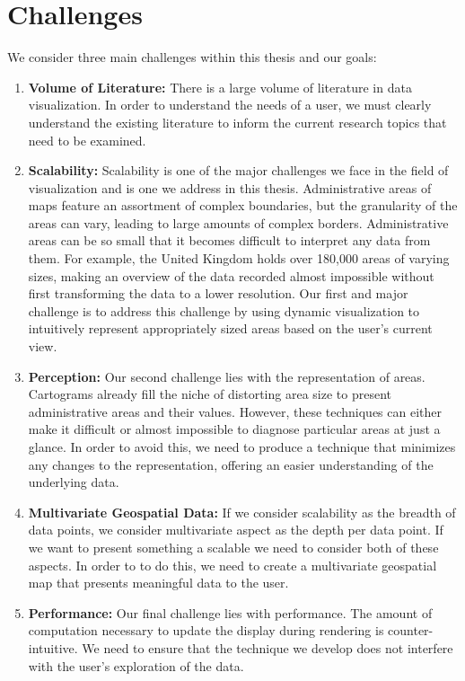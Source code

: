 \section{Challenges} \label{sec:challenges}
We consider three main challenges within this thesis and our goals:
\begin{enumerate}
\item \textbf{Volume of Literature:} There is a large volume of literature in data visualization. In order to understand the needs of a user, we must clearly understand the existing literature to inform the current research topics that need to be examined. 
\item \textbf{Scalability:} Scalability is one of the major challenges we face in the field of visualization and is one we address in this thesis. Administrative areas of maps feature an assortment of complex boundaries, but the granularity of the areas can vary, leading to large amounts of complex borders. Administrative areas can be so small that it becomes difficult to interpret any data from them. For example, the United Kingdom holds over 180,000 areas of varying sizes, making an overview of the data recorded almost impossible without first transforming the data to a lower resolution. Our first and major challenge is to address this challenge by using dynamic visualization to intuitively represent appropriately sized areas based on the user's current view.
\item \textbf{Perception:} Our second challenge lies with the representation of areas. Cartograms already fill the niche of distorting area size to present administrative areas and their values. However, these techniques can either make it difficult or almost impossible to diagnose particular areas at just a glance. In order to avoid this, we need to produce a technique that minimizes any changes to the representation, offering an easier understanding of the underlying data.
\item \textbf{Multivariate Geospatial Data:} If we consider scalability as the breadth of data points, we consider multivariate aspect as the depth per data point. If we want to present something a scalable we need to consider both of these aspects. In order to to do this, we need to create a multivariate geospatial map that presents meaningful data to the user.
\item \textbf{Performance:} Our final challenge lies with performance. The amount of computation necessary to update the display during rendering is counter-intuitive. We need to ensure that the technique we develop does not interfere with the user's exploration of the data.
\end{enumerate}

